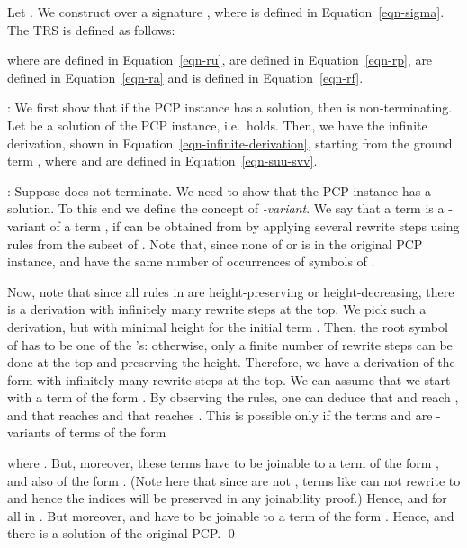 \documentclass{LMCS}
\theoremstyle{plain}
\newcommand\ignore[1]{}
\begin{document}
Let .
We construct  over a signature , where  is defined in
Equation~\ref{eqn-sigma}.
The TRS  is defined as follows:

where 
 are defined in Equation~\ref{eqn-ru},
 are defined in Equation~\ref{eqn-rp},
 are defined in Equation~\ref{eqn-ra}
and
 is defined in Equation~\ref{eqn-rf}.

\ignore{
In order to see how this works, we will call
 to the term ,
 to the term ,
 to the term ,

We want to see that, if there is a solution of the original PCP
problem, then the resulting TRS is not terminating.
\endignore}

:
We first show that if the PCP instance has a solution, then
 is non-terminating.
Let 
be a solution of the PCP instance,
i.e.\  holds.
Then, we have the infinite derivation, shown in Equation~\ref{eqn-infinite-derivation},
starting from the ground term , where
 and  are defined in Equation~\ref{eqn-suu-svv}.


:
Suppose  does not terminate. We need to show that the PCP 
instance has a solution.
To this end we define the concept of {\em -variant}.
We say that a term  is a -variant of a term , if
 can be obtained from  by applying several rewrite
steps using rules from the subset
 of .
Note that, since none of  or  is  in 
the original PCP instance,
 and  have the same number
of occurrences of symbols of .

Now, note that since all rules in  are height-preserving or 
height-decreasing,
there is a derivation with infinitely many rewrite steps at the top.
We pick such a derivation, but with minimal height for
the initial term . 
Then, the root symbol of  has to be one of the
's: otherwise, only a finite number of rewrite
steps can be done at the top
and preserving the height.
Therefore, we have a derivation of the form
 with infinitely many rewrite
steps at the top. We can assume that we start
with a term of the form . By observing the  rules,
one can deduce that  and  reach , and that
 reaches  and that  reaches .
This is possible only if the terms  and  are
-variants of terms of the form

where .
But, moreover, these terms have to be joinable to a term of the form
 ,
and also of the form . 
(Note here that since  are not , terms like
 can not rewrite to  and hence
the indices  will be preserved
in any joinability proof.)
Hence,  and  for all  in . But moreover,
 and  have to be joinable to a term of the form
. Hence,
 and there is a solution
of the original PCP.  \qed
\end{document}

